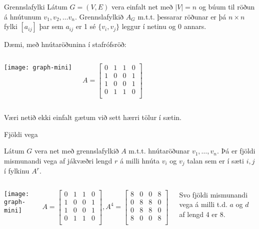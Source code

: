 \documentclass{beamer}
\begin{document}
\begin{frame}{Grennslafylki}
	Látum $G = (V, E)$ vera einfalt net með $|V| = n$ og búum til röðun á hnútunum $v_1, v_2, \ldots v_n$. Grennslafylkið $A_G$ m.t.t. þessarar röðunar er þá $n \times n$ fylki $[a_{ij}]$ þar sem $a_{ij}$ er 1 sé $\{v_i,v_j\}$ leggur í netinu og 0 annars.

	Dæmi, með hnútaröðunina í stafrófsröð:
	\begin{columns}
		\begin{center}
			\texttt{[image: graph-mini]}
		\end{center}
		\[
			A =
			\begin{bmatrix}
				0 & 1 & 1 & 0 \\
				1 & 0 & 0 & 1 \\
				1 & 0 & 0 & 1 \\
				0 & 1 & 1 & 0 \\
			\end{bmatrix}
		\]
	\end{columns}
	\vspace{0.2cm}
	Væri netið ekki einfalt gætum við sett hærri tölur í sætin.
\end{frame}

\begin{frame}{Fjöldi vega}
	\begin{tcolorbox}
		Látum $G$ vera net með grennslafylkið $A$ m.t.t. hnútaröðunar $v_1, \ldots, v_n$. Þá er fjöldi mismunandi vega af jákvæðri lengd $r$ á milli hnúta $v_i$ og $v_j$ talan sem er í sæti $i,j$ í fylkinu $A^r$.
	\end{tcolorbox}
	\begin{columns}
		\column{0.2\textwidth}
		\begin{center}
			\texttt{[image: graph-mini]}
		\end{center}
		\column{0.6\textwidth}
		\[
			A =
			\begin{bmatrix}
				0 & 1 & 1 & 0 \\
				1 & 0 & 0 & 1 \\
				1 & 0 & 0 & 1 \\
				0 & 1 & 1 & 0 \\
			\end{bmatrix}
			,
			A^4 =
			\begin{bmatrix}
				8 & 0 & 0 & 8 \\
				0 & 8 & 8 & 0 \\
				0 & 8 & 8 & 0 \\
				8 & 0 & 0 & 8 \\
			\end{bmatrix}
		\]
		\begin{center}
			Svo fjöldi mismunandi vega á milli t.d. $a$ og $d$ af lengd 4 er 8.
		\end{center}
	\end{columns}
\end{frame}
\end{document}
